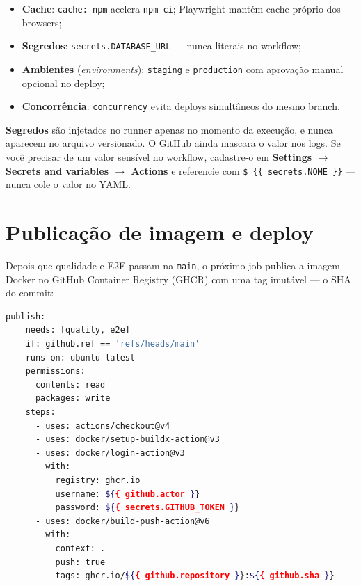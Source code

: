 \begin{itemize}[leftmargin=*, itemsep=0.4em]
  \item \textbf{Cache}: \texttt{cache: npm} acelera \texttt{npm ci}; Playwright mantém cache próprio dos browsers;
  \item \textbf{Segredos}: \texttt{secrets.DATABASE\_URL} — nunca literais no workflow;
  \item \textbf{Ambientes} (\emph{environments}): \texttt{staging} e \texttt{production} com aprovação manual opcional no deploy;
  \item \textbf{Concorrência}: \texttt{concurrency} evita deploys simultâneos do mesmo branch.
\end{itemize}

\begin{caixaconceito}
\textbf{Segredos} são injetados no runner apenas no momento da execução, e
nunca aparecem no arquivo versionado. O GitHub ainda mascara o valor nos logs.
Se você precisar de um valor sensível no workflow, cadastre-o em
\textbf{Settings $\rightarrow$ Secrets and variables $\rightarrow$ Actions} e
referencie com \texttt{\$ \{\{ secrets.NOME \}\}} — nunca cole o valor no YAML.
\end{caixaconceito}

\section{Publicação de imagem e deploy}

Depois que qualidade e E2E passam na \texttt{main}, o próximo job publica a
imagem Docker no GitHub Container Registry (GHCR) com uma tag imutável — o
SHA do commit:

\begin{lstlisting}[style=livro, language=Bash,
  caption={Job de publicação da imagem no GHCR.}, label={list:cicd-publish}]
  publish:
    needs: [quality, e2e]
    if: github.ref == 'refs/heads/main'
    runs-on: ubuntu-latest
    permissions:
      contents: read
      packages: write
    steps:
      - uses: actions/checkout@v4
      - uses: docker/setup-buildx-action@v3
      - uses: docker/login-action@v3
        with:
          registry: ghcr.io
          username: ${{ github.actor }}
          password: ${{ secrets.GITHUB_TOKEN }}
      - uses: docker/build-push-action@v6
        with:
          context: .
          push: true
          tags: ghcr.io/${{ github.repository }}:${{ github.sha }}
\end{lstlisting}

